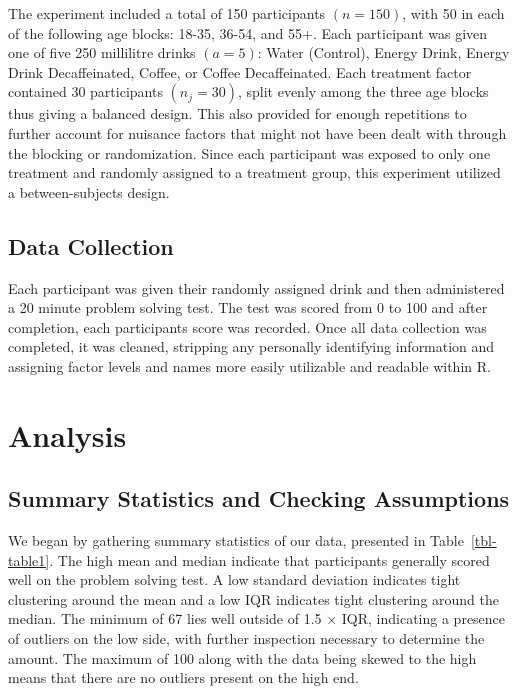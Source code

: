 \documentclass[
  letterpaper,
  DIV=11,
  numbers=noendperiod]{scrartcl}
\begin{document}
The experiment included a total of 150 participants \((n = 150)\), with
50 in each of the following age blocks: 18-35, 36-54, and 55+. Each
participant was given one of five 250 millilitre drinks \((a = 5)\):
Water (Control), Energy Drink, Energy Drink Decaffeinated, Coffee, or
Coffee Decaffeinated. Each treatment factor contained 30 participants
\((n_j = 30)\), split evenly among the three age blocks thus giving a
balanced design. This also provided for enough repetitions to further
account for nuisance factors that might not have been dealt with through
the blocking or randomization. Since each participant was exposed to
only one treatment and randomly assigned to a treatment group, this
experiment utilized a between-subjects design.

\subsection{Data Collection}\label{data-collection}

Each participant was given their randomly assigned drink and then
administered a 20 minute problem solving test. The test was scored from
0 to 100 and after completion, each participants score was recorded.
Once all data collection was completed, it was cleaned, stripping any
personally identifying information and assigning factor levels and names
more easily utilizable and readable within R.

\section{Analysis}\label{analysis}

\subsection{Summary Statistics and Checking
Assumptions}\label{summary-statistics-and-checking-assumptions}

We began by gathering summary statistics of our data, presented in
Table~\ref{tbl-table1}. The high mean and median indicate that
participants generally scored well on the problem solving test. A low
standard deviation indicates tight clustering around the mean and a low
IQR indicates tight clustering around the median. The minimum of 67 lies
well outside of 1.5 \(\times\) IQR, indicating a presence of outliers on
the low side, with further inspection necessary to determine the amount.
The maximum of 100 along with the data being skewed to the high means
that there are no outliers present on the high end.
\end{document}
